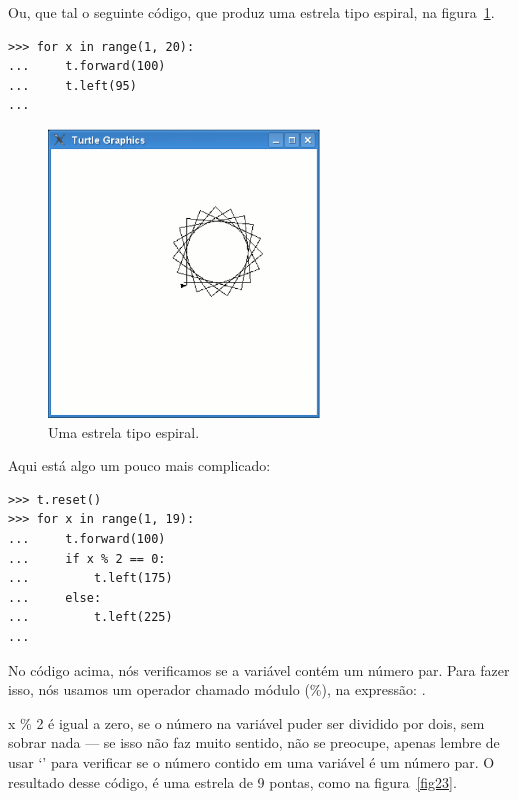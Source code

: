 \noindent
Ou, que tal o seguinte código, que produz uma estrela tipo espiral, na figura~\ref{fig22}.

\begin{listing}
\begin{verbatim}
>>> for x in range(1, 20):
...     t.forward(100)
...     t.left(95)
...
\end{verbatim}
\end{listing}

\begin{figure}
\begin{center}
\includegraphics[width=72mm]{eps/figure22.eps}
\end{center}
\caption{Uma estrela tipo espiral.}\label{fig22}
\end{figure}

\noindent
Aqui está algo um pouco mais complicado:

\begin{listing}
\begin{verbatim}
>>> t.reset()
>>> for x in range(1, 19):
...     t.forward(100)
...     if x % 2 == 0:
...         t.left(175)
...     else:
...         t.left(225)
...
\end{verbatim}
\end{listing}

No código acima, nós verificamos se a variável  contém um número par. Para fazer isso, nós usamos um operador chamado módulo (\%), na expressão: .
\par
x \% 2 é igual a zero, se o número na variável  puder ser dividido por dois, sem sobrar nada --- se isso não faz muito sentido, não se preocupe, apenas lembre de usar `' para verificar se o número contido em uma variável é um número par. O resultado desse código, é uma estrela de 9 pontas, como na figura~\ref{fig23}.

